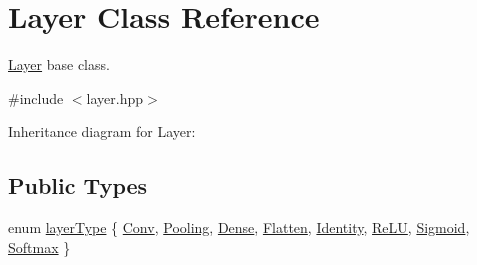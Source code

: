 \hypertarget{class_layer}{}\section{Layer Class Reference}
\label{class_layer}


\hyperlink{class_layer}{Layer} base class.  




{\ttfamily \#include $<$layer.\+hpp$>$}



Inheritance diagram for Layer\+:
\subsection*{Public Types}
\begin{DoxyCompactItemize}
\item 
enum \hyperlink{class_layer_a823f18343920cda4f52dce36df6e851f}{layer\+Type} \{ \newline
\hyperlink{class_layer_a823f18343920cda4f52dce36df6e851fa4b20a9fd11ab5ce6ddf7e96132a09874}{Conv}, 
\hyperlink{class_layer_a823f18343920cda4f52dce36df6e851faa0f3ab198628863fa278bb74d691580d}{Pooling}, 
\hyperlink{class_layer_a823f18343920cda4f52dce36df6e851fa3991260525bace1f310b5d74491fedda}{Dense}, 
\hyperlink{class_layer_a823f18343920cda4f52dce36df6e851fa8ba6b7fd5e9998bcbc016719fab3446e}{Flatten}, 
\newline
\hyperlink{class_layer_a823f18343920cda4f52dce36df6e851fa1f4e286d2ed8671757e5aa9c3c4dd940}{Identity}, 
\hyperlink{class_layer_a823f18343920cda4f52dce36df6e851fa50a083e4de6026ff8c48a763d44b3224}{Re\+LU}, 
\hyperlink{class_layer_a823f18343920cda4f52dce36df6e851fa467cf9e29d4001586b13a922da0dc34b}{Sigmoid}, 
\hyperlink{class_layer_a823f18343920cda4f52dce36df6e851fad34b12e05ec54f3885a71b7207b630de}{Softmax}
 \}
\end{DoxyCompactItemize}
